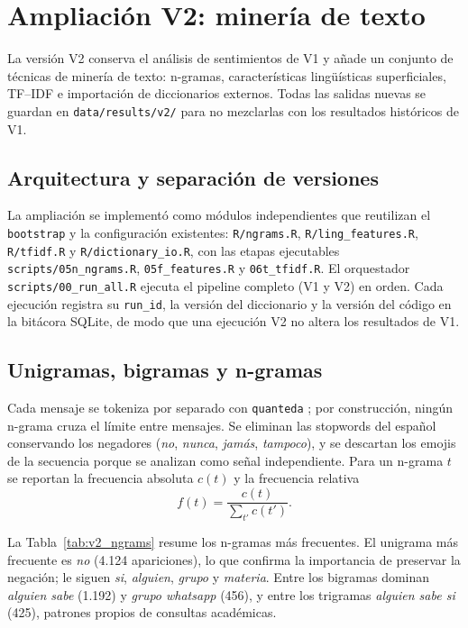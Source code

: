 \section{Ampliación V2: minería de texto}
\label{sec:v2}

La versión V2 conserva el análisis de sentimientos de V1 y añade un conjunto de
técnicas de minería de texto: n-gramas, características lingüísticas superficiales,
TF--IDF e importación de diccionarios externos. Todas las salidas nuevas se guardan
en \texttt{data/results/v2/} para no mezclarlas con los resultados históricos de V1.

\subsection{Arquitectura y separación de versiones}

La ampliación se implementó como módulos independientes que reutilizan el
\texttt{bootstrap} y la configuración existentes: \texttt{R/ngrams.R},
\texttt{R/ling\_features.R}, \texttt{R/tfidf.R} y \texttt{R/dictionary\_io.R}, con las
etapas ejecutables \texttt{scripts/05n\_ngrams.R}, \texttt{05f\_features.R} y
\texttt{06t\_tfidf.R}. El orquestador \texttt{scripts/00\_run\_all.R} ejecuta el
pipeline completo (V1 y V2) en orden. Cada ejecución registra su
\texttt{run\_id}, la versión del diccionario y la versión del código en la bitácora
SQLite, de modo que una ejecución V2 no altera los resultados de V1.

\subsection{Unigramas, bigramas y n-gramas}

Cada mensaje se tokeniza por separado con \texttt{quanteda} \citep{benoit2018quanteda};
por construcción, ningún n-grama cruza el límite entre mensajes. Se eliminan las
stopwords del español conservando los negadores (\emph{no}, \emph{nunca}, \emph{jamás},
\emph{tampoco}), y se descartan los emojis de la secuencia porque se analizan como
señal independiente. Para un n-grama $t$ se reportan la frecuencia absoluta $c(t)$ y la
frecuencia relativa
\begin{equation}
  f(t) = \frac{c(t)}{\sum_{t'} c(t')}.
\end{equation}

La Tabla~\ref{tab:v2_ngrams} resume los n-gramas más frecuentes. El unigrama más frecuente
es \emph{no} (4.124 apariciones), lo que confirma la importancia de preservar la
negación; le siguen \emph{si}, \emph{alguien}, \emph{grupo} y \emph{materia}. Entre los
bigramas dominan \emph{alguien sabe} (1.192) y \emph{grupo whatsapp} (456), y entre los
trigramas \emph{alguien sabe si} (425), patrones propios de consultas académicas.

